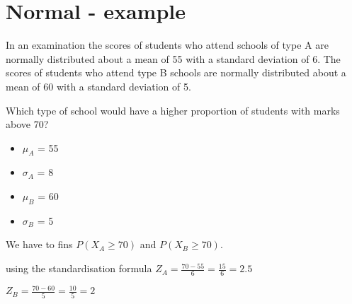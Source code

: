 


\section{Normal - example}

In an examination the scores of students who attend schools of type A are
normally distributed about a mean of 55 with a standard deviation of 6. The
scores of students who attend type B schools are normally distributed about a
mean of 60 with a standard deviation of 5.

Which type of school would have a higher proportion of students with marks above 70?

\begin{itemize}
	\item $\mu_A$ = 55
	\item $\sigma_A$ = 8
	\item $\mu_B$ = 60
	\item $\sigma_B$ = 5
\end{itemize}

We have to fins $P(X_A \geq 70)$
and $P(X_B \geq 70)$.


using the standardisation formula
$Z_A = \frac{70 - 55}{6} = \frac{15}{6} = 2.5 $

$Z_B = \frac{70 - 60}{5} = \frac{10}{5} = 2 $



